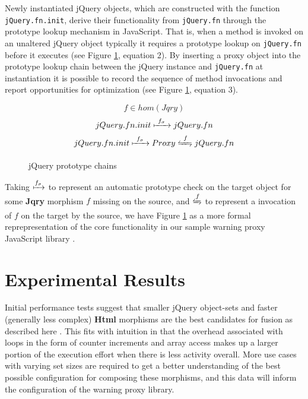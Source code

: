 \documentclass[preprint]{sigplanconf}
\begin{document}
Newly instantiated jQuery objects, which are constructed with the function \verb|jQuery.fn.init|, derive their functionality from \verb|jQuery.fn| through the prototype lookup mechanism in JavaScript. That is, when a method is invoked on an unaltered jQuery object typically it requires a prototype lookup on \verb|jQuery.fn| before it executes (see Figure \ref{eq:jquery-proto}, equation 2). By inserting a proxy object into the prototype lookup chain between the jQuery instance and \verb|jQuery.fn| at instantiation it is possible to record the sequence of method invocations and report opportunities for optimization (see Figure \ref{eq:jquery-proto}, equation 3).

\begin{figure}
\begin{equation}
 f \in hom(Jqry)
\end{equation}
\begin{equation} jQuery.fn.init \xmapsto{\ f_{\sigma}\ } jQuery.fn
\end{equation}
\begin{equation}
 jQuery.fn.init \xmapsto{\ f_{\sigma}\ } Proxy \xleftrightharpoons{\ f\ } jQuery.fn
\end{equation}
\nocaptionrule \caption{jQuery prototype chains}
\label{eq:jquery-proto}
\end{figure}

Taking \begin{math}\xmapsto{f_{\sigma}}\end{math} to represent an automatic prototype check on the target object for some \textbf{Jqry} morphism \begin{math}f\end{math} missing on the source, and \begin{math}\xleftrightharpoons{f}\end{math} to represent a invocation of \begin{math}f\end{math} on the target by the source, we have Figure \ref{eq:jquery-proto} as a more formal reprepresentation of the core functionality in our sample warning proxy JavaScript library \cite{bib:github-warning-proxy}.

\section{Experimental Results}

Initial performance tests suggest that smaller jQuery object-sets and faster (generally less complex) \textbf{Html} morphisms are the best candidates for fusion as described here \cite{bib:perf}. This fits with intuition in that the overhead associated with loops in the form of counter increments and array access makes up a larger portion of the execution effort when there is less activity overall. More use cases with varying set sizes are required to get a better understanding of the best possible configuration for composing these morphisms, and this data will inform the configuration of the warning proxy library.
\end{document}
